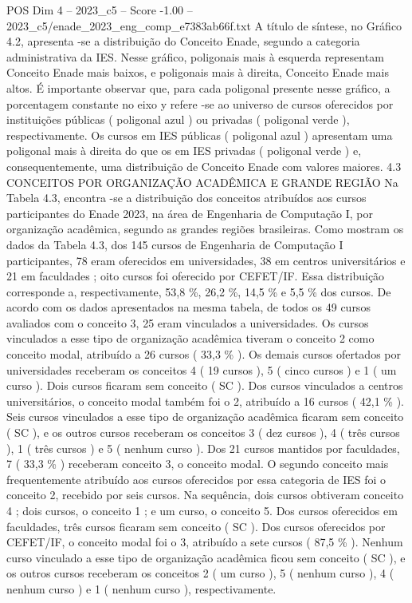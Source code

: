 \begin{textsample}{POS Dim 4 – 2023\_c5 – Score -1.00 – 2023\_c5/enade\_2023\_eng\_comp\_e7383ab66f.txt}
A título de síntese, no Gráfico 4.2, apresenta -se a distribuição do Conceito Enade, segundo a categoria administrativa da IES.
Nesse gráfico, poligonais mais à esquerda representam Conceito Enade mais baixos, e poligonais mais à direita, Conceito Enade mais altos.
É importante observar que, para cada poligonal presente nesse gráfico, a porcentagem constante no eixo y refere -se ao universo de cursos oferecidos por instituições públicas ( poligonal azul ) ou privadas ( poligonal verde ), respectivamente.
Os cursos em IES públicas ( poligonal azul ) apresentam uma poligonal mais à direita do que os em IES privadas ( poligonal verde ) e, consequentemente, uma distribuição de Conceito Enade com valores maiores. 4.3 CONCEITOS POR ORGANIZAÇÃO ACADÊMICA E GRANDE REGIÃO Na Tabela 4.3, encontra -se a distribuição dos conceitos atribuídos aos cursos participantes do Enade 2023, na área de Engenharia de Computação I, por organização acadêmica, segundo as grandes regiões brasileiras.
Como mostram os dados da Tabela 4.3, dos 145 cursos de Engenharia de Computação I participantes, 78 eram oferecidos em universidades, 38 em centros universitários e 21 em faculdades ; oito cursos foi oferecido por CEFET/IF.
Essa distribuição corresponde a, respectivamente, 53,8 \%, 26,2 \%, 14,5 \% e 5,5 \% dos cursos.
De acordo com os dados apresentados na mesma tabela, de todos os 49 cursos avaliados com o conceito 3, 25 eram vinculados a universidades.
Os cursos vinculados a esse tipo de organização acadêmica tiveram o conceito 2 como conceito modal, atribuído a 26 cursos ( 33,3 \% ).
Os demais cursos ofertados por universidades receberam os conceitos 4 ( 19 cursos ), 5 ( cinco cursos ) e 1 ( um curso ).
Dois cursos ficaram sem conceito ( SC ).
Dos cursos vinculados a centros universitários, o conceito modal também foi o 2, atribuído a 16 cursos ( 42,1 \% ).
Seis cursos vinculados a esse tipo de organização acadêmica ficaram sem conceito ( SC ), e os outros cursos receberam os conceitos 3 ( dez cursos ), 4 ( três cursos ), 1 ( três cursos ) e 5 ( nenhum curso ).
Dos 21 cursos mantidos por faculdades, 7 ( 33,3 \% ) receberam conceito 3, o conceito modal.
O segundo conceito mais frequentemente atribuído aos cursos oferecidos por essa categoria de IES foi o conceito 2, recebido por seis cursos.
Na sequência, dois cursos obtiveram conceito 4 ; dois cursos, o conceito 1 ; e um curso, o conceito 5.
Dos cursos oferecidos em faculdades, três cursos ficaram sem conceito ( SC ).
Dos cursos oferecidos por CEFET/IF, o conceito modal foi o 3, atribuído a sete cursos ( 87,5 \% ).
Nenhum curso vinculado a esse tipo de organização acadêmica ficou sem conceito ( SC ), e os outros cursos receberam os conceitos 2 ( um curso ), 5 ( nenhum curso ), 4 ( nenhum curso ) e 1 ( nenhum curso ), respectivamente.

\end{textsample}
